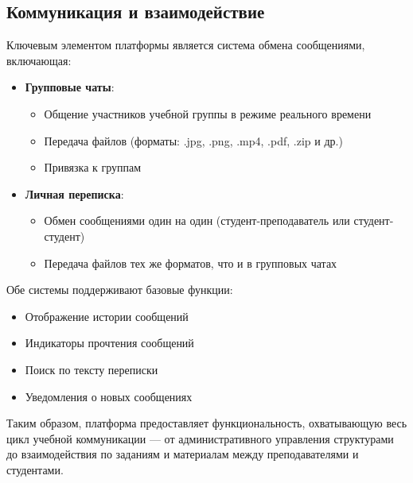 \subsection{Коммуникация и взаимодействие}
Ключевым элементом платформы является система обмена сообщениями, включающая:

\begin{itemize}
    \item \textbf{Групповые чаты}:
    \begin{itemize}
        \item Общение участников учебной группы в режиме реального времени
        \item Передача файлов (форматы: .jpg, .png, .mp4, .pdf, .zip и др.)
        \item Привязка к группам
    \end{itemize}
    
    \item \textbf{Личная переписка}:
    \begin{itemize}
        \item Обмен сообщениями один на один (студент-преподаватель или студент-студент)
        \item Передача файлов тех же форматов, что и в групповых чатах
    \end{itemize}
\end{itemize}

Обе системы поддерживают базовые функции:
\begin{itemize}
    \item Отображение истории сообщений
    \item Индикаторы прочтения сообщений
    \item Поиск по тексту переписки
    \item Уведомления о новых сообщениях
\end{itemize}

Таким образом, платформа предоставляет функциональность, охватывающую весь цикл учебной коммуникации — от административного управления структурами до взаимодействия по заданиям и материалам между преподавателями и студентами.